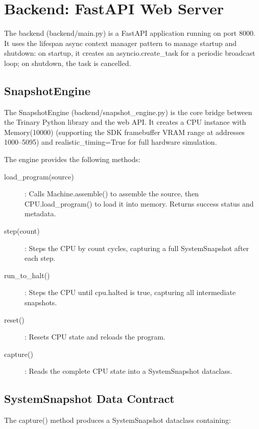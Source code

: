 \documentclass[12pt,a4paper,twoside]{book}
\theoremstyle{trinarytheorem}
\theoremstyle{trinarydefinition}
\newcommand{\code}[1]{\textsf{#1}}
\begin{document}
\section{Backend: FastAPI Web Server}

The backend (\code{backend/main.py}) is a FastAPI application running on
port 8000. It uses the \code{lifespan} async context manager pattern to
manage startup and shutdown: on startup, it creates an
\code{asyncio.create\_task} for a periodic broadcast loop; on shutdown,
the task is cancelled.

\subsection{SnapshotEngine}

The \code{SnapshotEngine} (\code{backend/snapshot\_engine.py}) is the
core bridge between the Trinary Python library and the web API. It
creates a \code{CPU} instance with \code{Memory(10000)} (supporting the
SDK framebuffer VRAM range at addresses 1000--5095) and
\code{realistic\_timing=True} for full hardware simulation.

The engine provides the following methods:
\begin{description}
    \item[\code{load\_program(source)}]: Calls \code{Machine.assemble()}
          to assemble the source, then \code{CPU.load\_program()} to
          load it into memory. Returns success status and metadata.
    \item[\code{step(count)}]: Steps the CPU by \code{count} cycles,
          capturing a full \code{SystemSnapshot} after each step.
    \item[\code{run\_to\_halt()}]: Steps the CPU until \code{cpu.halted}
          is true, capturing all intermediate snapshots.
    \item[\code{reset()}]: Resets CPU state and reloads the program.
    \item[\code{capture()}]: Reads the complete CPU state into a
          \code{SystemSnapshot} dataclass.
\end{description}

\subsection{SystemSnapshot Data Contract}

The \code{capture()} method produces a \code{SystemSnapshot} dataclass
containing:
\end{document}
